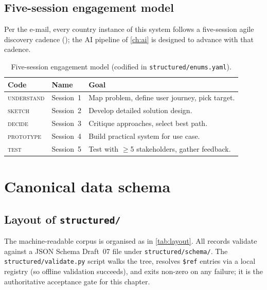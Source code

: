\documentclass[11pt,a4paper,twoside]{report}
\newcommand{\corpus}{}
\begin{document}
\section{Five-session engagement model}

Per the e-mail, every country instance of this system follows a
five-session agile discovery cadence
(); the AI pipeline of \cref{ch:ai} is designed to
advance with that cadence.

\begin{table}[htbp]
\centering
\caption{Five-session engagement model (codified in
         \corpus\texttt{structured/enums.yaml}).}
\label{tab:sessions}
\small
\begin{tabularx}{\linewidth}{@{}l l X@{}}
\toprule
\textbf{Code} & \textbf{Name} & \textbf{Goal} \\ \midrule
\textsc{understand} & Session~1 & Map problem, define user journey, pick target. \\
\textsc{sketch}     & Session~2 & Develop detailed solution design. \\
\textsc{decide}     & Session~3 & Critique approaches, select best path. \\
\textsc{prototype}  & Session~4 & Build practical system for use case. \\
\textsc{test}       & Session~5 & Test with $\geq$5 stakeholders, gather feedback. \\
\bottomrule
\end{tabularx}
\end{table}
\chapter{Canonical data schema}\label{ch:schema}

\section{Layout of \texttt{structured/}}

The machine-readable corpus is organised as in \cref{tab:layout}.
All records validate against a JSON Schema Draft~07 file under
\corpus\texttt{structured/schema/}. The
\corpus\texttt{structured/validate.py} script walks the tree, resolves
\texttt{\$ref} entries via a local registry (so offline validation
succeeds), and exits non-zero on any failure; it is the authoritative
acceptance gate for this chapter.
\end{document}
